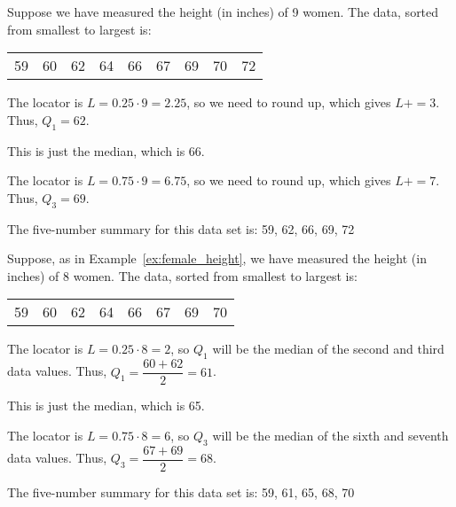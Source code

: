 \documentclass{beamer}
\begin{document}
\begin{frame}
\begin{example}\label{ex:female_height}
Suppose we have measured the height (in inches) of 9 women. The data, sorted from smallest to largest is:
\begin{center}
\begin{tabular}{ccccccccc}
59 & 60 & 62 & 64 & 66 & 67 & 69 & 70 & 72
\end{tabular}
\end{center}

\onslide<+->
\begin{description}[<+- | alert@+>]
\item[Finding $Q_1$:] The locator is $L=0.25\cdot 9=2.25$, so we need to round up, which gives $L+=3$. Thus, $Q_1=62$.
\item[Finding $Q_2$:] This is just the median, which is 66.
\item[Finding $Q_3$:] The locator is $L=0.75\cdot 9=6.75$, so we need to round up, which gives $L+=7$. Thus, $Q_3=69$.
\end{description}

\onslide<+->
The five-number summary for this data set is: 59, 62, 66, 69, 72
\end{example}
\end{frame}

\begin{frame}
\begin{example}
Suppose, as in Example~\ref{ex:female_height}, we have measured the height (in inches) of 8 women. The data, sorted from smallest to largest is:
\begin{center}
\begin{tabular}{cccccccc}
59 & 60 & 62 & 64 & 66 & 67 & 69 & 70
\end{tabular}
\end{center}

\onslide<+->
\begin{description}[<+- | alert@+>]
\item[Finding $Q_1$:] The locator is $L=0.25\cdot 8=2$, so $Q_1$ will be the median of the second and third data values. Thus, $Q_1=\dfrac{60+62}{2}=61$.
\item[Finding $Q_2$:] This is just the median, which is 65.
\item[Finding $Q_3$:] The locator is $L=0.75\cdot 8=6$, so $Q_3$ will be the median of the sixth and seventh data values. Thus, $Q_3=\dfrac{67+69}{2}=68$.\end{description}

\onslide<+->
The five-number summary for this data set is: 59, 61, 65, 68, 70
\end{example}
\end{frame}
\end{document}
